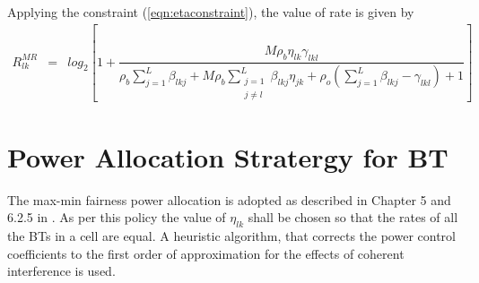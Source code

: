 \documentclass[10pt, a4paper, twoside,fleqn]{article}
\begin{document}
Applying the constraint (\ref{eqn:etaconstraint}), the value of rate is given by
\begin{eqnarray}\label{eqn:rateot}
R_{lk}^{MR} &=& log_2\left[1+\dfrac{M\rho_b\eta_{lk}\gamma_{lkl}}{ \rho_b\sum\limits_{j=1}^{L}\beta_{lkj}+M\rho_b\sum\limits_{\substack{j=1 \\ j \neq l}}^{L}\beta_{lkj}\eta_{jk} +\rho_o\left(\sum\limits_{j=1}^{L}\beta_{lkj} -\gamma_{lkl}\right)+1}\right]
\end{eqnarray}


\section{Power Allocation Stratergy for BT}
The max-min fairness power allocation is adopted as described in Chapter 5 and 6.2.5 in \cite{bib:MassiveMimoBook}. As per this policy the value of $\eta_{lk}$ shall be chosen so that the rates of all the BTs in a cell are equal. A heuristic algorithm, that corrects the power control coefficients to the first order of approximation for the effects of coherent interference is used.
\end{document}
